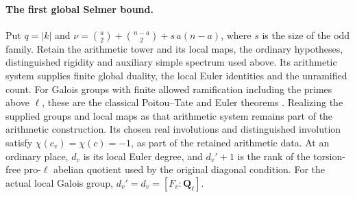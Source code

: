 \paragraph{The first global Selmer bound.}
Put $q=|k|$ and
$\nu=\binom a2+\binom{n-a}2+s\,a(n-a)$, where $s$ is the size
of the odd family. Retain the arithmetic tower and its local maps,
the ordinary hypotheses, distinguished rigidity and auxiliary simple
spectrum used above. Its arithmetic system supplies finite global
duality, the local Euler identities and the unramified count. For
Galois groups with finite allowed ramification including the primes
above $\ell$, these are the classical Poitou--Tate and Euler theorems
\cite[I, Theorems 2.3, 2.8, 4.10, 5.1 and Corollary 4.15]{milne-adt}.
Realizing the supplied groups and local maps as that arithmetic
system remains part of the arithmetic construction.
Its chosen real involutions and distinguished involution satisfy
$\chi(c_v)=\chi(c)=-1$, as part of the retained arithmetic data.
At an ordinary place, $d_v$ is its local Euler degree, and
$d_v'+1$ is the rank of the torsion-free pro-$\ell$ abelian quotient
used by the original diagonal condition. For the actual local
Galois group, $d_v'=d_v=[F_v:\mathbf Q_\ell]$.

